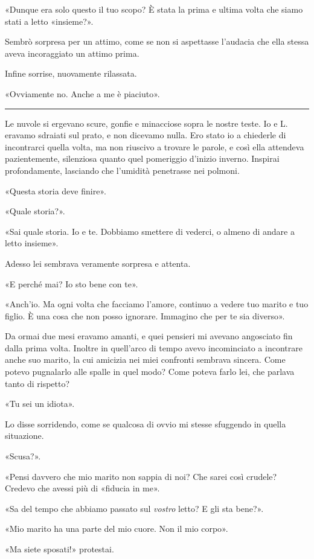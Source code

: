 «Dunque era solo questo il tuo scopo? È stata la prima e ultima volta che siamo stati a letto
«insieme?».

Sembrò sorpresa per un attimo, come se non si aspettasse l'audacia che ella stessa aveva
incoraggiato un attimo prima.

Infine sorrise, nuovamente rilassata.

«Ovviamente no. Anche a me è piaciuto».

\plainbreak{1}

Le nuvole si ergevano scure, gonfie e minacciose sopra le nostre teste. Io e L. eravamo sdraiati sul
prato, e non dicevamo nulla. Ero stato io a chiederle di incontrarci quella volta, ma non riuscivo a
trovare le parole, e così ella attendeva pazientemente, silenziosa quanto quel pomeriggio d'inizio
inverno. Inspirai profondamente, lasciando che l'umidità penetrasse nei polmoni.

«Questa storia deve finire».

«Quale storia?».

«Sai quale storia. Io e te. Dobbiamo smettere di vederci, o almeno di andare a letto insieme».

Adesso lei sembrava veramente sorpresa e attenta.

«E perché mai? Io sto bene con te».

«Anch'io. Ma ogni volta che facciamo l'amore, continuo a vedere tuo marito e tuo figlio. È una cosa
che non posso ignorare. Immagino che per te sia diverso».

Da ormai due mesi eravamo amanti, e quei pensieri mi avevano angosciato fin dalla prima volta.
Inoltre in quell'arco di tempo avevo incominciato a incontrare anche suo marito, la cui amicizia nei
miei confronti sembrava sincera. Come potevo pugnalarlo alle spalle in quel modo? Come poteva farlo
lei, che parlava tanto di rispetto?

«Tu sei un idiota».

Lo disse sorridendo, come se qualcosa di ovvio mi stesse sfuggendo in quella situazione.

«Scusa?».

«Pensi davvero che mio marito non sappia di noi? Che sarei così crudele? Credevo che avessi più di
«fiducia in me».

«Sa del tempo che abbiamo passato sul \emph{vostro} letto? E gli sta bene?».

«Mio marito ha una parte del mio cuore. Non il mio corpo».

«Ma siete sposati!» protestai.

